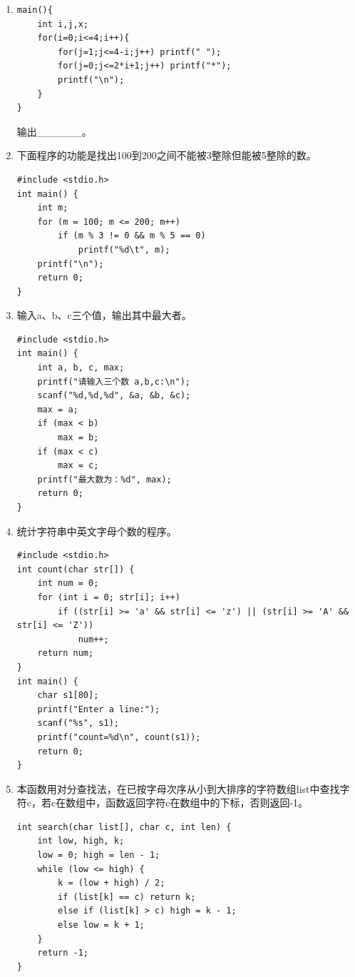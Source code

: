 \documentclass[a4paper,12pt]{article}
\begin{document}
\begin{enumerate}
	\item
	      \begin{verbatim}
main(){
    int i,j,x;
    for(i=0;i<=4;i++){
        for(j=1;j<=4-i;j++) printf(" ");
        for(j=0;j<=2*i+1;j++) printf("*");
        printf("\n");
    }
}
    \end{verbatim}
	      输出\_\_\_\_\_\_。
	      \vspace{0.3cm}

	\item 下面程序的功能是找出100到200之间不能被3整除但能被5整除的数。
	      \begin{verbatim}
#include <stdio.h>
int main() {
    int m;
    for (m = 100; m <= 200; m++)
        if (m % 3 != 0 && m % 5 == 0)
            printf("%d\t", m);
    printf("\n");
    return 0;
}
    \end{verbatim}
	      \vspace{0.3cm}

	\item 输入a、b、c三个值，输出其中最大者。
	      \begin{verbatim}
#include <stdio.h>
int main() {
    int a, b, c, max;
    printf("请输入三个数 a,b,c:\n");
    scanf("%d,%d,%d", &a, &b, &c);
    max = a;
    if (max < b)
        max = b;
    if (max < c)
        max = c;
    printf("最大数为：%d", max);
    return 0;
}
    \end{verbatim}
	      \vspace{0.3cm}

	\item 统计字符串中英文字母个数的程序。
	      \begin{verbatim}
#include <stdio.h>
int count(char str[]) {
    int num = 0;
    for (int i = 0; str[i]; i++)
        if ((str[i] >= 'a' && str[i] <= 'z') || (str[i] >= 'A' && str[i] <= 'Z'))
            num++;
    return num;
}
int main() {
    char s1[80];
    printf("Enter a line:");
    scanf("%s", s1);
    printf("count=%d\n", count(s1));
    return 0;
}
    \end{verbatim}
	      \vspace{0.3cm}

	\item 本函数用对分查找法，在已按字母次序从小到大排序的字符数组list中查找字符c，若c在数组中，函数返回字符c在数组中的下标，否则返回-1。
	      \begin{verbatim}
int search(char list[], char c, int len) {
    int low, high, k;
    low = 0; high = len - 1;
    while (low <= high) {
        k = (low + high) / 2;
        if (list[k] == c) return k;
        else if (list[k] > c) high = k - 1;
        else low = k + 1;
    }
    return -1;
}
    \end{verbatim}
	      \vspace{0.3cm}


\end{enumerate}
\end{document}
